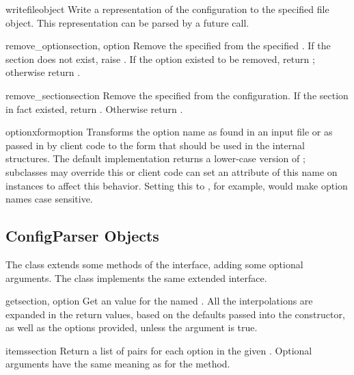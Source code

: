 \begin{methoddesc}{write}{fileobject}
Write a representation of the configuration to the specified file
object.  This representation can be parsed by a future 
call.
\end{methoddesc}

\begin{methoddesc}{remove_option}{section, option}
Remove the specified  from the specified .
If the section does not exist, raise . 
If the option existed to be removed, return ;
otherwise return .
\end{methoddesc}

\begin{methoddesc}{remove_section}{section}
Remove the specified  from the configuration.
If the section in fact existed, return .
Otherwise return .
\end{methoddesc}

\begin{methoddesc}{optionxform}{option}
Transforms the option name  as found in an input file or
as passed in by  client code to the form that should be used in the
internal structures.  The default implementation returns a lower-case
version of ; subclasses may override this or client code
can set an attribute of this name on instances to affect this
behavior.  Setting this to , for example, would make
option names case sensitive.
\end{methoddesc}


\subsection{ConfigParser Objects \label{ConfigParser-objects}}

The  class extends some methods of the
 interface, adding some optional arguments.
The  class implements the same extended
interface.

\begin{methoddesc}{get}{section, option}
Get an  value for the named .  All the
\character{\%} interpolations are expanded in the return values, based
on the defaults passed into the constructor, as well as the options
 provided, unless the  argument is true.
\end{methoddesc}

\begin{methoddesc}{items}{section}
Return a list of  pairs for each
option in the given . Optional arguments have the
same meaning as for the  method.
\end{methoddesc}
